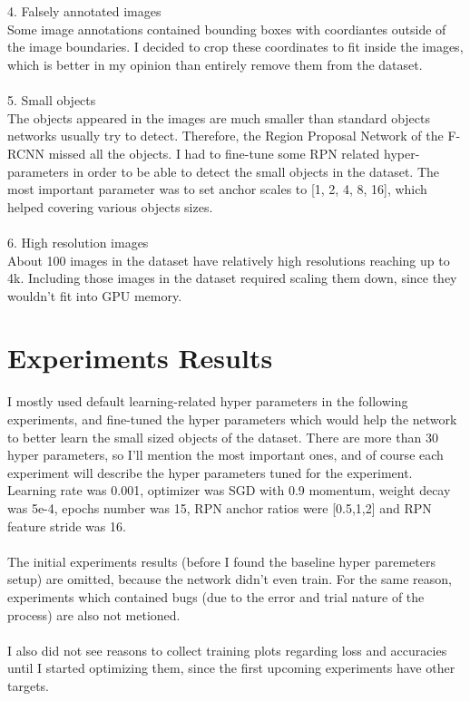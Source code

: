 \documentclass[]{article}
\begin{document}
\\\\
4. Falsely annotated images\\
Some image annotations contained bounding boxes with coordiantes outside of the image boundaries. I decided to crop these coordinates to fit inside the images, which is better in my opinion than entirely remove them from the dataset.
\\\\
5. Small objects\\
The objects appeared in the images are much smaller than standard objects networks usually try to detect. Therefore, the Region Proposal Network of the F-RCNN \cite{fasterrcnn} missed all the objects. I had to fine-tune some RPN related hyper-parameters in order to be able to detect the small objects in the dataset. The most important parameter was to set anchor scales to [1, 2, 4, 8, 16], which helped covering various objects sizes.
\\\\
6. High resolution images\\
About 100 images in the dataset have relatively high resolutions reaching up to 4k. Including those images in the dataset required scaling them down, since they wouldn't fit into GPU memory.

\section{Experiments Results}
I mostly used default learning-related hyper parameters in the following experiments, and fine-tuned the hyper parameters which would help the network to better learn the small sized objects of the dataset. There are more than 30 hyper parameters, so I'll mention the most important ones, and of course each experiment will describe the hyper parameters tuned for the experiment.\\
Learning rate was 0.001, optimizer was SGD with 0.9 momentum, weight decay was 5e-4, epochs number was 15, RPN anchor ratios were [0.5,1,2] and RPN feature stride was 16.
\\\\
The initial experiments results (before I found the baseline hyper paremeters setup) are omitted, because the network didn't even train. For the same reason, experiments which contained bugs (due to the error and trial nature of the process) are also not metioned.
\\\\
I also did not see reasons to collect training plots regarding loss and accuracies until I started optimizing them, since the first upcoming experiments have other targets.
\end{document}
